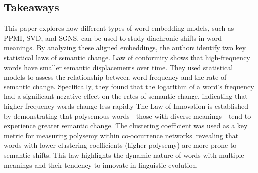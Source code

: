 \subsection{Takeaways}\label{subsec:takeaways4}
This paper explores how different types of word embedding models, such as PPMI, SVD, and SGNS, can be used to study diachronic shifts in word meanings.
By analyzing these aligned embeddings, the authors identify two key statistical laws of semantic change.
Law of conformity shows that high-frequency words have smaller semantic displacements over time.
They used statistical models to assess the relationship between word frequency and the rate of semantic change. Specifically, they found that the logarithm of a word's frequency had a significant negative effect on the rates of semantic change, indicating that higher frequency words change less rapidly
The Law of Innovation is established by demonstrating that polysemous words—those with diverse meanings—tend to experience greater semantic change. The clustering coefficient was used as a key metric for measuring polysemy within co-occurrence networks, revealing that words with lower clustering coefficients (higher polysemy) are more prone to semantic shifts.
This law highlights the dynamic nature of words with multiple meanings and their tendency to innovate in linguistic evolution.

